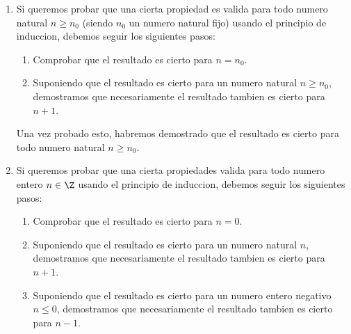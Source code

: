\begin{enumerate}
	\item Si queremos probar que una cierta propiedad es valida para todo numero natural \(n \geq  n_0\) (siendo \(n_0 \) un numero natural fijo) usando el principio de induccion, debemos seguir los siguientes pasos: \begin{enumerate}
		      \item Comprobar que el resultado es cierto para \(n = n_0 \).
		      \item Suponiendo que el resultado es cierto para un numero natural \(n \geq n_0 \), demostramos que necesariamente el resultado tambien es cierto para \(n + 1 \).
	      \end{enumerate}
	      Una vez probado esto, habremos demostrado que el resultado es cierto para todo numero natural \(n \geq  n_0 \).

	\item Si queremos probar que una cierta propiedades valida para todo numero entero \(n \in  \Z \) usando el principio de induccion, debemos seguir los siguientes pasos:
	      \begin{enumerate}
		      \item Comprobar que el resultado es cierto para \(n = 0 \).
		      \item Suponiendo que el resultado es cierto para un numero natural \(n \), demostramos que necesariamente el resultado tambien es cierto para \(n + 1 \).
		      \item Suponiendo que el resultado es cierto para un numero entero negativo \(n \leq  0 \), demostramos que necesariamente el resultado tambien es cierto para \(n - 1\).
	      \end{enumerate}

\end{enumerate}

